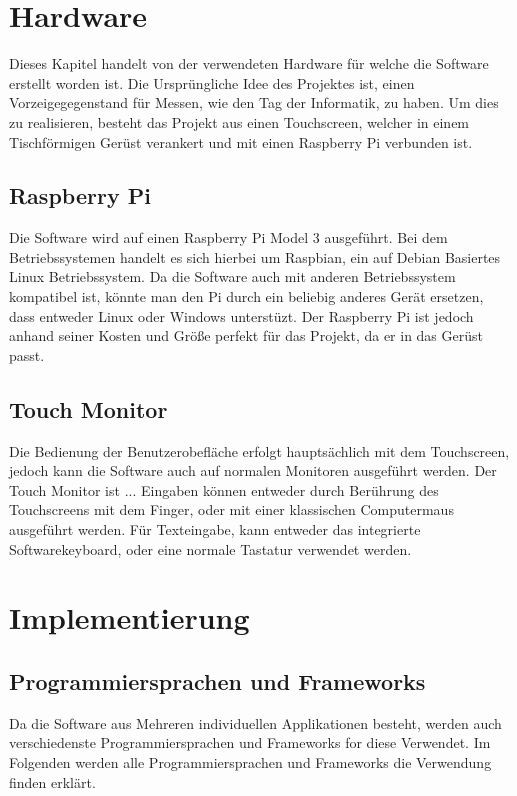 \documentclass[12pt,a4paper,bibliography=totocnumbered,listof=totocnumbered]{article}
\begin{document}
\pagebreak
\section{Hardware}
Dieses Kapitel handelt von der verwendeten Hardware für welche die Software erstellt worden ist. 
Die Ursprüngliche Idee des Projektes ist, einen Vorzeigegegenstand für Messen, wie den Tag der Informatik, zu haben.
Um dies zu realisieren, besteht das Projekt aus einen Touchscreen, welcher in einem Tischförmigen Gerüst verankert 
und mit einen Raspberry Pi verbunden ist.

\subsection{Raspberry Pi}
Die Software wird auf einen Raspberry Pi Model 3 ausgeführt. Bei dem Betriebssystemen handelt es sich hierbei um 
Raspbian, ein auf Debian Basiertes Linux Betriebssystem. \cite{RaspberryPi} Da die Software auch mit anderen Betriebssystem
kompatibel ist, könnte man den Pi durch ein beliebig anderes Gerät ersetzen, dass entweder Linux oder Windows unterstüzt.
Der Raspberry Pi ist jedoch anhand seiner Kosten und Größe perfekt für das Projekt, da er in das Gerüst passt.

\subsection{Touch Monitor}
Die Bedienung der Benutzerobefläche erfolgt hauptsächlich mit dem Touchscreen, jedoch kann die Software auch auf normalen Monitoren ausgeführt werden.
Der Touch Monitor ist ...%
Eingaben können entweder durch Berührung des Touchscreens mit dem Finger, oder mit einer klassischen Computermaus ausgeführt werden.
Für Texteingabe, kann entweder das integrierte Softwarekeyboard, oder eine normale Tastatur verwendet werden.



\pagebreak
\section{Implementierung}

\subsection{Programmiersprachen und Frameworks}
Da die Software aus Mehreren individuellen Applikationen besteht, werden auch verschiedenste Programmiersprachen und Frameworks for diese Verwendet.
Im Folgenden werden alle Programmiersprachen und Frameworks die Verwendung finden erklärt.
\end{document}
